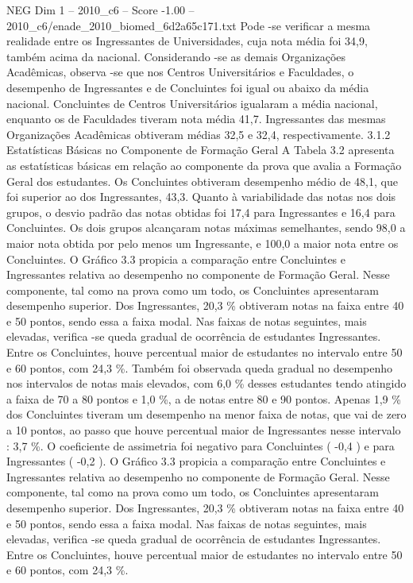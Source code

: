 \begin{textsample}{NEG Dim 1 – 2010\_c6 – Score -1.00 – 2010\_c6/enade\_2010\_biomed\_6d2a65c171.txt}
Pode -se verificar a mesma realidade entre os Ingressantes de Universidades, cuja nota média foi 34,9, também acima da nacional.
Considerando -se as demais Organizações Acadêmicas, observa -se que nos Centros Universitários e Faculdades, o desempenho de Ingressantes e de Concluintes foi igual ou abaixo da média nacional.
Concluintes de Centros Universitários igualaram a média nacional, enquanto os de Faculdades tiveram nota média 41,7.
Ingressantes das mesmas Organizações Acadêmicas obtiveram médias 32,5 e 32,4, respectivamente. 3.1.2 Estatísticas Básicas no Componente de Formação Geral A Tabela 3.2 apresenta as estatísticas básicas em relação ao componente da prova que avalia a Formação Geral dos estudantes.
Os Concluintes obtiveram desempenho médio de 48,1, que foi superior ao dos Ingressantes, 43,3.
Quanto à variabilidade das notas nos dois grupos, o desvio padrão das notas obtidas foi 17,4 para Ingressantes e 16,4 para Concluintes.
Os dois grupos alcançaram notas máximas semelhantes, sendo 98,0 a maior nota obtida por pelo menos um Ingressante, e 100,0 a maior nota entre os Concluintes.
O Gráfico 3.3 propicia a comparação entre Concluintes e Ingressantes relativa ao desempenho no componente de Formação Geral.
Nesse componente, tal como na prova como um todo, os Concluintes apresentaram desempenho superior.
Dos Ingressantes, 20,3 \% obtiveram notas na faixa entre 40 e 50 pontos, sendo essa a faixa modal.
Nas faixas de notas seguintes, mais elevadas, verifica -se queda gradual de ocorrência de estudantes Ingressantes.
Entre os Concluintes, houve percentual maior de estudantes no intervalo entre 50 e 60 pontos, com 24,3 \%.
Também foi observada queda gradual no desempenho nos intervalos de notas mais elevados, com 6,0 \% desses estudantes tendo atingido a faixa de 70 a 80 pontos e 1,0 \%, a de notas entre 80 e 90 pontos.
Apenas 1,9 \% dos Concluintes tiveram um desempenho na menor faixa de notas, que vai de zero a 10 pontos, ao passo que houve percentual maior de Ingressantes nesse intervalo : 3,7 \%.
O coeficiente de assimetria foi negativo para Concluintes ( -0,4 ) e para Ingressantes ( -0,2 ).
O Gráfico 3.3 propicia a comparação entre Concluintes e Ingressantes relativa ao desempenho no componente de Formação Geral.
Nesse componente, tal como na prova como um todo, os Concluintes apresentaram desempenho superior.
Dos Ingressantes, 20,3 \% obtiveram notas na faixa entre 40 e 50 pontos, sendo essa a faixa modal.
Nas faixas de notas seguintes, mais elevadas, verifica -se queda gradual de ocorrência de estudantes Ingressantes.
Entre os Concluintes, houve percentual maior de estudantes no intervalo entre 50 e 60 pontos, com 24,3 \%.

\end{textsample}
